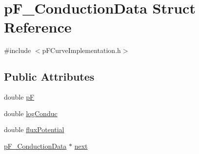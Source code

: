 \hypertarget{structp_f___conduction_data}{
\section{pF\_\-ConductionData Struct Reference}
\label{structp_f___conduction_data}
}


{\ttfamily \#include $<$pFCurveImplementation.h$>$}\subsection*{Public Attributes}
\begin{DoxyCompactItemize}
\item 
double \hyperlink{structp_f___conduction_data_a34d456198c3ee6c21d1b942f2da190ea}{pF}
\item 
double \hyperlink{structp_f___conduction_data_a1fbf6af77ca62f85f0d82876b38f3e46}{logConduc}
\item 
double \hyperlink{structp_f___conduction_data_ac4bf15ddcbe2b9c623cc61f2f36b14d2}{fluxPotential}
\item 
\hyperlink{structp_f___conduction_data}{pF\_\-ConductionData} $\ast$ \hyperlink{structp_f___conduction_data_aac9d0907d010665bf4718ed10280f435}{next}
\end{DoxyCompactItemize}


